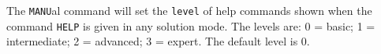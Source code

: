 \headb

The {\tt MANU}al command will set the {\tt level} of help commands
shown when the command {\tt HELP} is given in any solution mode.
The levels are: 0 = basic; 1 = intermediate; 2 = advanced; 3 = expert.
The default level is 0.
\vfil\eject
